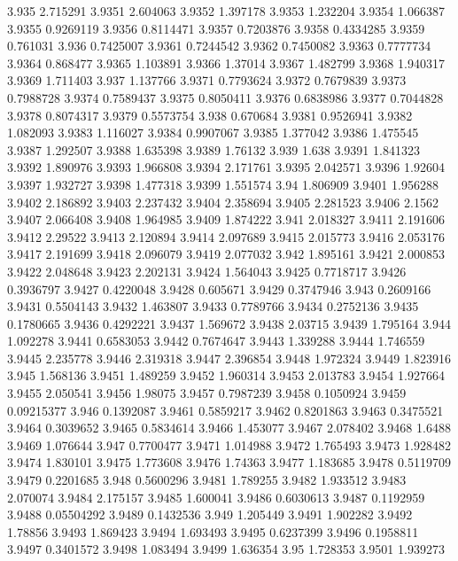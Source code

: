 3.935  2.715291
3.9351  2.604063
3.9352  1.397178
3.9353  1.232204
3.9354  1.066387
3.9355  0.9269119
3.9356  0.8114471
3.9357  0.7203876
3.9358  0.4334285
3.9359  0.761031
3.936  0.7425007
3.9361  0.7244542
3.9362  0.7450082
3.9363  0.7777734
3.9364  0.868477
3.9365  1.103891
3.9366  1.37014
3.9367  1.482799
3.9368  1.940317
3.9369  1.711403
3.937  1.137766
3.9371  0.7793624
3.9372  0.7679839
3.9373  0.7988728
3.9374  0.7589437
3.9375  0.8050411
3.9376  0.6838986
3.9377  0.7044828
3.9378  0.8074317
3.9379  0.5573754
3.938  0.670684
3.9381  0.9526941
3.9382  1.082093
3.9383  1.116027
3.9384  0.9907067
3.9385  1.377042
3.9386  1.475545
3.9387  1.292507
3.9388  1.635398
3.9389  1.76132
3.939  1.638
3.9391  1.841323
3.9392  1.890976
3.9393  1.966808
3.9394  2.171761
3.9395  2.042571
3.9396  1.92604
3.9397  1.932727
3.9398  1.477318
3.9399  1.551574
3.94  1.806909
3.9401  1.956288
3.9402  2.186892
3.9403  2.237432
3.9404  2.358694
3.9405  2.281523
3.9406  2.1562
3.9407  2.066408
3.9408  1.964985
3.9409  1.874222
3.941  2.018327
3.9411  2.191606
3.9412  2.29522
3.9413  2.120894
3.9414  2.097689
3.9415  2.015773
3.9416  2.053176
3.9417  2.191699
3.9418  2.096079
3.9419  2.077032
3.942  1.895161
3.9421  2.000853
3.9422  2.048648
3.9423  2.202131
3.9424  1.564043
3.9425  0.7718717
3.9426  0.3936797
3.9427  0.4220048
3.9428  0.605671
3.9429  0.3747946
3.943  0.2609166
3.9431  0.5504143
3.9432  1.463807
3.9433  0.7789766
3.9434  0.2752136
3.9435  0.1780665
3.9436  0.4292221
3.9437  1.569672
3.9438  2.03715
3.9439  1.795164
3.944  1.092278
3.9441  0.6583053
3.9442  0.7674647
3.9443  1.339288
3.9444  1.746559
3.9445  2.235778
3.9446  2.319318
3.9447  2.396854
3.9448  1.972324
3.9449  1.823916
3.945  1.568136
3.9451  1.489259
3.9452  1.960314
3.9453  2.013783
3.9454  1.927664
3.9455  2.050541
3.9456  1.98075
3.9457  0.7987239
3.9458  0.1050924
3.9459  0.09215377
3.946  0.1392087
3.9461  0.5859217
3.9462  0.8201863
3.9463  0.3475521
3.9464  0.3039652
3.9465  0.5834614
3.9466  1.453077
3.9467  2.078402
3.9468  1.6488
3.9469  1.076644
3.947  0.7700477
3.9471  1.014988
3.9472  1.765493
3.9473  1.928482
3.9474  1.830101
3.9475  1.773608
3.9476  1.74363
3.9477  1.183685
3.9478  0.5119709
3.9479  0.2201685
3.948  0.5600296
3.9481  1.789255
3.9482  1.933512
3.9483  2.070074
3.9484  2.175157
3.9485  1.600041
3.9486  0.6030613
3.9487  0.1192959
3.9488  0.05504292
3.9489  0.1432536
3.949  1.205449
3.9491  1.902282
3.9492  1.78856
3.9493  1.869423
3.9494  1.693493
3.9495  0.6237399
3.9496  0.1958811
3.9497  0.3401572
3.9498  1.083494
3.9499  1.636354
3.95  1.728353
3.9501  1.939273
